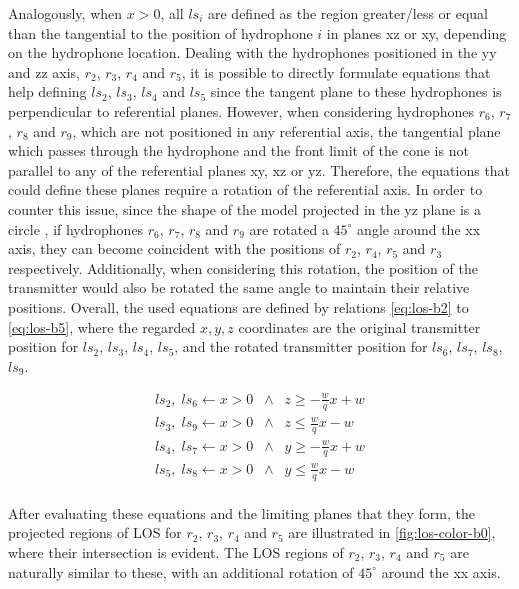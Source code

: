 Analogously, when $x > 0$, all $ls_i$ are defined as the region greater/less or equal than the tangential to the position of hydrophone $i$ in planes xz or xy, depending on the hydrophone location. Dealing with the hydrophones positioned in the yy and zz axis, $r_2$, $r_3$, $r_4$ and $r_5$, it is possible to directly formulate equations that help defining $ls_2$, $ls_3$, $ls_4$ and $ls_5$ since the tangent plane to these hydrophones is perpendicular to referential planes. However, when considering hydrophones $r_6$, $r_7$, $r_8$ and $r_9$, which are not positioned in any referential axis, the tangential plane which passes through the hydrophone and the front limit of the cone is not parallel to any of the referential planes xy, xz or yz. Therefore, the equations that could define these planes require a rotation of the referential axis. In order to counter this issue, since the shape of the model projected in the yz plane is a circle , if hydrophones $r_6$, $r_7$, $r_8$ and $r_9$ are rotated a $45^{\circ}$ angle around the xx axis, they can become coincident with the positions of $r_2$, $r_4$, $r_5$ and $r_3$ respectively. Additionally, when considering this rotation, the position of the transmitter would also be rotated the same angle to maintain their relative positions. Overall, the used equations are defined by relations \ref{eq:los-b2} to \ref{eq:los-b5}, where the regarded $x,y,z$ coordinates are the original transmitter position for $ls_2$, $ls_3$, $ls_4$, $ls_5$, and the rotated transmitter position for $ls_6$, $ls_7$, $ls_8$, $ls_9$.

\begin{eqnarray}
ls_2, \;  ls_6  \gets x > 0 \; \;  \wedge  \; \; z \geq -\frac{w}{q} x + w  \\
\label{eq:los-b2}
ls_3, \;  ls_9 \gets x > 0 \; \;  \wedge  \; \; z \leq \frac{w}{q} x - w  \\
\label{eq:los-b3}
ls_4, \;  ls_7 \gets x > 0 \; \;  \wedge  \; \; y \geq -\frac{w}{q} x + w   \\
\label{eq:los-b4}
ls_5, \;  ls_8 \gets x > 0 \; \;  \wedge  \; \; y \leq \frac{w}{q} x - w  \\
\label{eq:los-b5}
\end{eqnarray}

After evaluating these equations and the limiting planes that they form, the projected regions of LOS for $r_2$, $r_3$, $r_4$ and $r_5$ are illustrated in \ref{fig:los-color-b0}, where their intersection is evident. The LOS regions of $r_2$, $r_3$, $r_4$ and $r_5$ are naturally similar to these, with an additional rotation of $45^{\circ}$ around the xx axis.

